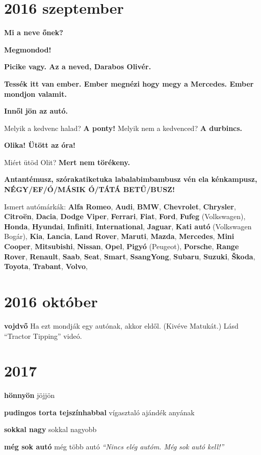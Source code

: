 \documentclass[a4paper]{memoir}
\newcommand{\f}[1]{\textbf{#1}} %
\newcommand{\e}{\hangpara{1.5em}{1}} %
\newcommand{\felix}[1]{\e \f{#1} \hspace{1ex}} %
\newcommand{\pelda}[1]{\textit{``#1''}} %
\begin{document}
\section*{2016 szeptember}

\e \f{Mi a neve őnek?}

\e \f{Megmondod!}

\e \f{Picike vagy. Az a neved, Darabos Olivér.}

\e \f{Tessék itt van ember. Ember megnézi hogy megy a Mercedes. Ember mondjon valamit.}

\e \f{Innől jön az autó.}

\e Melyik a kedvenc halad? \f{A ponty!} Melyik nem a kedvenced? \f{A durbincs.}

\e \f{Olika! Ütött az óra!}

\e Miért ütöd Olit? \f{Mert nem törékeny.}

\e \f{Antantémusz, szórakatiketuka labalabimbambusz vén ela kénkampusz, NÉGY/EF/Ó/MÁSIK Ó/TÁTÁ BETŰ/BUSZ!}

\e Ismert autómárkák:
\f{Alfa Romeo},
\f{Audi},
\f{BMW},
\f{Chevrolet},
\f{Chrysler},
\f{Citroën},
\f{Dacia},
\f{Dodge Viper},
\f{Ferrari},
\f{Fiat},
\f{Ford},
\f{Fufeg} (Volkswagen),
\f{Honda},
\f{Hyundai},
\f{Infiniti},
\f{International},
\f{Jaguar},
\f{Kati autó} (Volkswagen Bogár),
\f{Kia},
\f{Lancia},
\f{Land Rover},
\f{Maruti},
\f{Mazda},
\f{Mercedes},
\f{Mini Cooper},
\f{Mitsubishi},
\f{Nissan},
\f{Opel},
\f{Pigyó} (Peugeot),
\f{Porsche},
\f{Range Rover},
\f{Renault},
\f{Saab},
\f{Seat},
\f{Smart},
\f{SsangYong},
\f{Subaru},
\f{Suzuki},
\f{Škoda},
\f{Toyota},
\f{Trabant},
\f{Volvo},

\section*{2016 október}

\felix{vojdvő} Ha ezt mondják egy autónak, akkor eldől. (Kivéve Matukát.) Lásd ``Tractor Tipping'' videó.

\section*{2017}

\felix{hönnyön} jöjjön

\felix{pudingos torta tejszínhabbal} vígasztaló ajándék anyának

\felix{sokkal nagy} sokkal nagyobb

\felix{még sok autó} még több autó \pelda{Nincs elég autóm. Még sok autó kell!}
\end{document}
